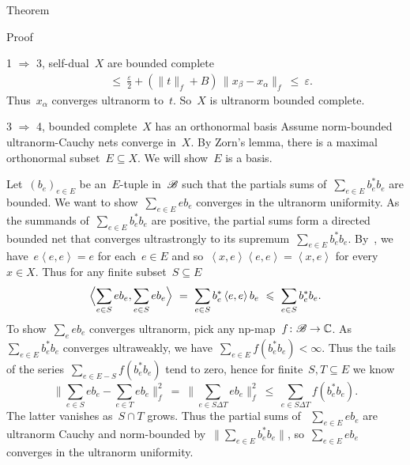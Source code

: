 \begin{parsec}
\begin{point}{Theorem}
\begin{point}{Proof}
\begin{point}{1 $\Rightarrow$ 3, self-dual~$X$ are bounded complete}
\begin{align*}
    & \ \leq\  \frac{\varepsilon}{2}
    + (\| t\|_f + B) \,\|x_\beta - x_\alpha\|_f \ \leq\  \varepsilon.
\end{align*}
Thus~$x_\alpha$ converges ultranorm to~$t$.
So~$X$ is ultranorm bounded complete.
\end{point}
\begin{point}{3
    $\Rightarrow$ 4, bounded complete~$X$ has an orthonormal basis}
    Assume norm-bounded ultranorm-Cauchy nets converge in~$X$.
By Zorn's lemma, there is a maximal orthonormal subset~$E \subseteq X$.
We will show~$E$ is a basis.

Let~$(b_e)_{e \in E}$ be an~$E$-tuple in~$\scrB$
such that the partials sums of~$\sum_{e \in E} b_e^*b_e$ are bounded.
We want to show~$\sum_{e \in E} e b_e$ converges in the ultranorm
    uniformity.
As the summands of~$\sum_{e \in E}b_e^*b_e$ are positive,
    the partial sums form a directed bounded net
    that converges ultrastrongly
    to its supremum~$\sum_{e \in E} b_e^*b_e$.
By~,
    we have~$e \left<e,e\right> = e$ for each~$e \in E$
    and so~$\left<x,e\right>\left<e,e\right> = \left<x,e\right>$
    for every~$x \in X$.
Thus for any finite subset~$S \subseteq E$
\begin{equation*}
    \Bigl<\sum_{e \in S} eb_e, \sum_{e \in S} eb_e\Bigr>
    \ =\  \sum_{e \in S} b_e^* \left<e,e\right>b_e
    \ \leq\  \sum_{e \in S} b_e^*b_e.
\end{equation*}
To show~$\sum_e eb_e$ converges ultranorm,
    pick any np-map~$f\colon \scrB \to \C$.
As~$\sum_{e \in E} b^*_eb_e$ converges ultraweakly,
we have~$\sum_{e \in E} f(b^*_eb_e) < \infty$.
Thus the tails of the series~$\sum_{e \in E - S} f(b_e^*b_e)$ tend to zero, hence for finite~$S,T\subseteq E$ we know
\begin{equation*}
    \bigl\| \sum_{e \in S} eb_e - \sum_{e\in T} eb_e \bigr\|_f^2
        \ =\  \bigl\| \sum_{e \in S\Delta T} eb_e  \bigr\|_f^2
        \ \leq \ \sum_{e \in S\Delta T} f(b_e^*b_e).
\end{equation*}
The latter vanishes as~$S \cap T$ grows.
Thus the partial sums of ~$\sum_{e \in E} eb_e$ are ultranorm Cauchy
and norm-bounded by~$\| \sum_{e \in E} b_e^*b_e \|$,
so~$\sum_{e \in E} eb_e$ converges in the ultranorm uniformity.


\end{point}
\end{point}
\end{point}
\end{parsec}
